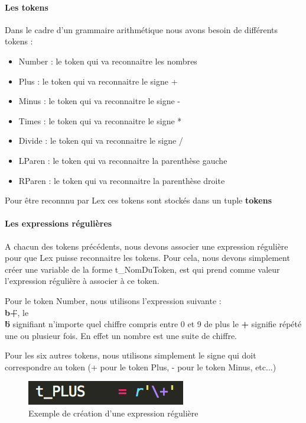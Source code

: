\documentclass[a4paper,12pt]{article}
\begin{document}
			\paragraph{Les tokens}

				Dans le cadre d'un grammaire arithmétique nous avons besoin de différents tokens : 
				\begin{itemize}
					\item Number : le token qui va reconnaitre les nombres
					\item Plus : le token qui va reconnaitre le signe +
					\item Minus : le token qui va reconnaitre le signe -
					\item Times : le token qui va reconnaitre le signe *
					\item Divide : le token qui va reconnaitre le signe /
					\item LParen : le token qui va reconnaitre la parenthèse gauche
					\item RParen : le token qui va reconnaitre la parenthèse droite
				\end{itemize}

				Pour être reconnnu par Lex ces tokens sont stockés dans un tuple \textbf{tokens} 

			\paragraph{Les expressions régulières}

				A chacun des tokens précédents, nous devons associer une expression régulière pour que Lex puisse reconnaitre les tokens.
				Pour cela, nous devons simplement créer une variable de la forme t\_NomDuToken, est qui prend comme valeur l'expression régulière à associer à ce token.

				Pour le token Number, nous utilisons l'expression suivante : \textbf{\"\\b+\"}, le \textbf{\"\\b\"} signifiant n'importe quel chiffre compris entre 0 et 9 de plus le \textbf{+} signifie répété une ou plusieur fois. En effet un nombre est une suite de chiffre.

				Pour les six autres tokens, nous utilisons simplement le signe qui doit correspondre au token (+ pour le token Plus, - pour le token Minus, etc...)
			
				\begin{figure}[h!]
					\begin{center}
						\includegraphics[scale=1]{images/exp_regex}
						\caption{Exemple de création d'une expression régulière}
					\end{center}
				\end{figure}
\end{document}
